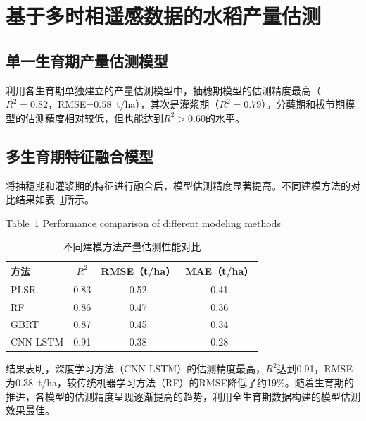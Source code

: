 \section{基于多时相遥感数据的水稻产量估测}
\label{sec:yield_estimation}

\subsection{单一生育期产量估测模型}
\label{subsec:single_stage}

利用各生育期单独建立的产量估测模型中，抽穗期模型的估测精度最高（$R^2=0.82$，RMSE=0.58~t/ha），其次是灌浆期（$R^2=0.79$）。分蘖期和拔节期模型的估测精度相对较低，但也能达到$R^2>0.60$的水平。

\subsection{多生育期特征融合模型}
\label{subsec:multi_stage}

将抽穗期和灌浆期的特征进行融合后，模型估测精度显著提高。不同建模方法的对比结果如表~\ref{tab:model_compare}所示。

\begin{table}[htbp]
  \centering
  \caption{不同建模方法产量估测性能对比}
  \label{tab:model_compare}
  \bigskip
  {\normalfont Table~\ref{tab:model_compare} Performance comparison of different modeling methods}\\[4pt]
  \begin{tabular}{lccc}
    \toprule
    方法 & $R^2$ & RMSE（t/ha） & MAE（t/ha） \\
    \midrule
    PLSR & 0.83 & 0.52 & 0.41 \\
    RF & 0.86 & 0.47 & 0.36 \\
    GBRT & 0.87 & 0.45 & 0.34 \\
    CNN-LSTM & 0.91 & 0.38 & 0.28 \\
    \bottomrule
  \end{tabular}
\end{table}

结果表明，深度学习方法（CNN-LSTM）的估测精度最高，$R^2$达到0.91，RMSE为0.38~t/ha，较传统机器学习方法（RF）的RMSE降低了约19\%。随着生育期的推进，各模型的估测精度呈现逐渐提高的趋势，利用全生育期数据构建的模型估测效果最佳。
